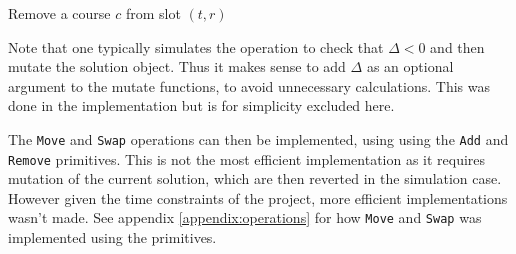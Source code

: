 \begin{algorithm}[H]
  \caption{Remove a course $c$ from slot $(t, r)$}
  \begin{algorithmic}[1]
       
          \State {}
      \EndIf
      \State {} 
    \EndFunction
    
    \Statex
             
        \EndIf
    \EndFunction
  \end{algorithmic}
\end{algorithm}

Note that one typically simulates the operation to check that $\Delta < 0$ and then mutate the solution object. Thus it makes sense to add $\Delta$ as an optional argument to the mutate functions, to avoid unnecessary calculations. This was done in the implementation but is for simplicity excluded here.

The \texttt{Move} and \texttt{Swap} operations can then be implemented, using using the \texttt{Add} and \texttt{Remove} primitives. This is not the most efficient implementation as it requires mutation of the current solution, which are then reverted in the simulation case. However given the time constraints of the project, more efficient implementations wasn't made. See appendix \ref{appendix:operations} for how \texttt{Move} and \texttt{Swap} was implemented using the primitives.
